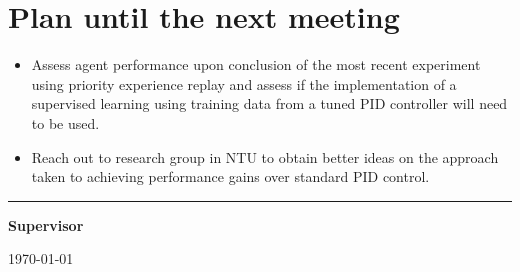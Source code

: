 \documentclass[12pt]{article}
\begin{document}
	\section{Plan until the next meeting}
	\begin{itemize}
		\item Assess agent performance upon conclusion of the most recent experiment using priority experience replay and assess if the implementation of a supervised learning using training data from a tuned PID controller will need to be used.
		\item Reach out to research group in NTU to obtain better ideas on the approach taken to achieving performance gains over standard PID control.
	\end{itemize}
	\par
	\vspace{\fill}%
	\noindent\rule{0.4\linewidth}{0.5pt}%
	\vspace{1em}%
	\par
	\noindent\textbf{Supervisor}\vspace{1em}%
	\par
	\noindent\today
\end{document}
